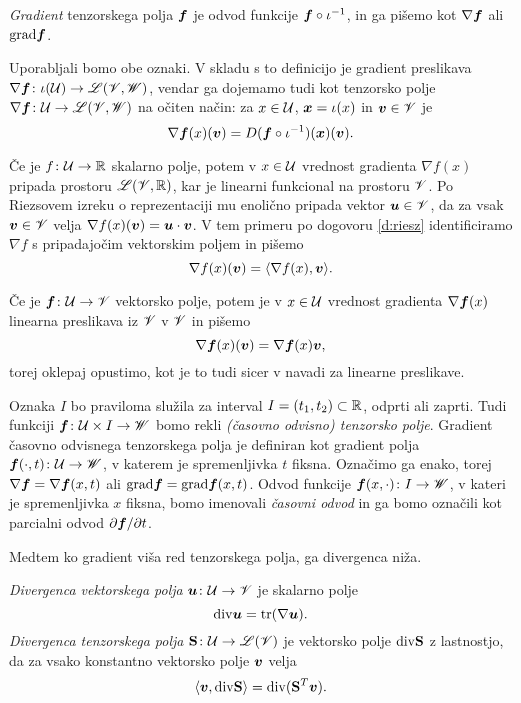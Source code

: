 \begin{definicija}
	\emph{Gradient} tenzorskega polja $\boldsymbol f$ je odvod funkcije $\boldsymbol f\circ\iota^{-1}$,
	in ga pišemo kot $\nabla\boldsymbol f$ ali $\mathrm{grad}\boldsymbol f$.
\end{definicija}
Uporabljali bomo obe oznaki. V skladu s to definicijo je gradient preslikava
$\nabla\boldsymbol f\colon\iota(\mathcal U)\to\mathscr L(\mathscr V,\mathscr W)$, vendar ga dojemamo tudi kot tenzorsko polje
$\nabla\boldsymbol f\colon\mathcal U\to\mathscr L(\mathscr V,\mathscr W)$ na očiten način: za $x\in \mathcal U$,
$\boldsymbol x=\iota(x)$ in $\boldsymbol v\in\mathscr V$ je
\[
	\nabla\boldsymbol f(x)(\boldsymbol v)=D(\boldsymbol f\circ\iota^{-1})(\boldsymbol x)(\boldsymbol v).
\]

Če je $f\colon \mathcal U\to\mathbb R$ skalarno polje, potem v $x\in \mathcal U$ vrednost gradienta $\nabla f(x)$
pripada prostoru $\mathscr L(\mathscr V,\mathbb R)$, kar je linearni funkcional na prostoru $\mathscr V$. Po Riezsovem
izreku o reprezentaciji mu enolično pripada vektor $\boldsymbol u\in\mathscr V$, da za vsak
$\boldsymbol v\in\mathscr V$ velja $\nabla f(x)(\boldsymbol v)=\boldsymbol u\cdot\boldsymbol v$. V tem primeru po
dogovoru \ref{d:riesz} identificiramo $\nabla f$ s pripadajočim vektorskim poljem in pišemo
\[ \nabla f(x)(\boldsymbol v)=\langle\nabla f(x),\boldsymbol v\rangle. \]

Če je $\boldsymbol f\colon \mathcal U\to\mathscr V$ vektorsko polje, potem je v $x\in \mathcal U$ vrednost gradienta $\nabla\boldsymbol f(x)$
linearna preslikava iz $\mathscr V$ v $\mathscr V$ in pišemo
\[ \nabla\boldsymbol f(x)(\boldsymbol v)=\nabla\boldsymbol f(x)\boldsymbol v, \]
torej oklepaj opustimo, kot je to tudi sicer v navadi za linearne preslikave.

Oznaka $I$ bo praviloma služila za interval $I=(t_1,t_2)\subset\mathbb R$, odprti ali zaprti. Tudi funkciji
$\boldsymbol f\colon \mathcal U\times I\to\mathscr W$ bomo rekli \emph{(časovno odvisno) tenzorsko polje}.
Gradient časovno odvisnega tenzorskega polja je definiran kot gradient polja
$\boldsymbol f(\cdot,t)\colon \mathcal U\to\mathscr W$, v katerem je spremenljivka $t$ fiksna. Označimo
ga enako, torej $\nabla\boldsymbol f=\nabla\boldsymbol f(x,t)$ ali $\mathrm{grad}\boldsymbol f=\mathrm{grad}\boldsymbol f(x,t)$.
Odvod funkcije $\boldsymbol f(x,\cdot)\colon I\to\mathscr W$, v kateri je spremenljivka $x$ fiksna,
bomo imenovali \emph{časovni odvod} in ga bomo označili kot parcialni odvod
$\partial\boldsymbol f/\partial t$.

Medtem ko gradient viša red tenzorskega polja, ga divergenca niža.
\begin{definicija} \label{def:div}
	\emph{Divergenca vektorskega polja} $\boldsymbol u\colon \mathcal U\to\mathscr V$ je skalarno polje
	\begin{equation} \label{e:div1}
		\mathrm{div}\boldsymbol u=\mathrm{tr}(\nabla\boldsymbol u).
	\end{equation}
	\emph{Divergenca tenzorskega polja} $\mathbf S\colon \mathcal U\to\mathscr L(\mathscr V)$ je vektorsko polje $\mathrm{div}\mathbf S$ z lastnostjo,
	da za vsako konstantno vektorsko polje $\boldsymbol v$ velja
	\begin{equation} \label{e:div2}
		\langle\boldsymbol v,\mathrm{div}\mathbf S\rangle = \mathrm{div}(\mathbf S^{T}\boldsymbol v).
	\end{equation}
\end{definicija}

